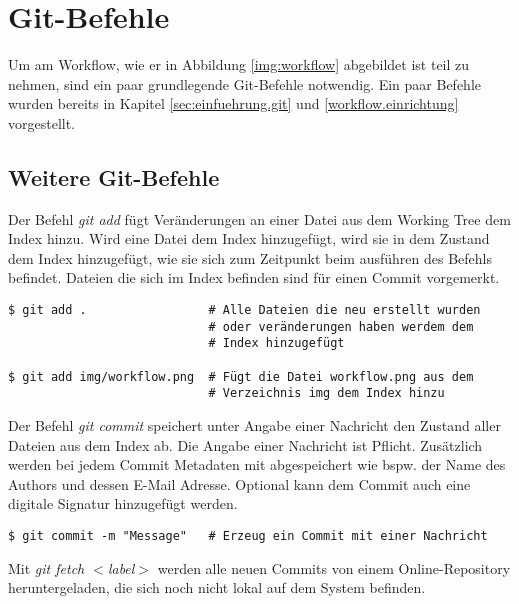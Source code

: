 \section{Git-Befehle}
\label{git-commands}

Um am Workflow, wie er in Abbildung \ref{img:workflow} abgebildet ist teil zu nehmen, sind ein paar grundlegende Git-Befehle notwendig. Ein paar Befehle wurden bereits in Kapitel \ref{sec:einfuehrung.git} und \ref{workflow.einrichtung} vorgestellt.

\subsection{Weitere Git-Befehle}
\label{git-commands.advanced}

\label{git-commands.advanced.add}
Der Befehl \textit{git add} fügt Veränderungen an einer Datei aus dem Working Tree dem Index hinzu. Wird eine Datei dem Index hinzugefügt, wird sie in dem Zustand dem Index hinzugefügt, wie sie sich zum Zeitpunkt beim ausführen des Befehls befindet. Dateien die sich im Index befinden sind für einen Commit vorgemerkt. 

\begin{verbatim}
$ git add .                 # Alle Dateien die neu erstellt wurden 
                            # oder veränderungen haben werdem dem 
                            # Index hinzugefügt
                            
$ git add img/workflow.png  # Fügt die Datei workflow.png aus dem 
                            # Verzeichnis img dem Index hinzu
\end{verbatim}

\label{git-commands.advanced.commit}
Der Befehl \textit{git commit} speichert unter Angabe einer Nachricht den Zustand aller Dateien aus dem Index ab. Die Angabe einer Nachricht ist Pflicht. Zusätzlich werden bei jedem Commit Metadaten mit abgespeichert wie bspw. der Name des Authors und dessen E-Mail Adresse. Optional kann dem Commit auch eine digitale Signatur hinzugefügt werden.

\begin{verbatim}
$ git commit -m "Message"   # Erzeug ein Commit mit einer Nachricht
\end{verbatim}

\label{git-commands.advanced.fetch}
Mit \textit{git fetch $ < $label$ > $} werden alle neuen Commits von einem Online-Repository heruntergeladen, die sich noch nicht lokal auf dem System befinden.

